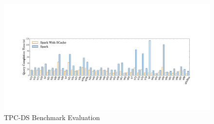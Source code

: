 \begin{figure}
	\centering
	\includegraphics[width=.8\textwidth]{fig/tpcds}
	\caption{TPC-DS Benchmark Evaluation}
	\label{fig:tpcds}
	\vspace{-1em}
\end{figure}


